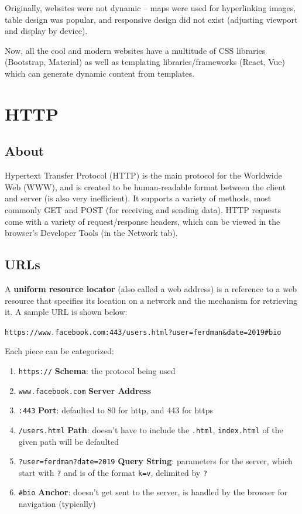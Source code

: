\documentclass{report}
\newcommand{\npar}{\par\noindent}
\newcommand{\vpar}{\vspace{1em}\npar}
\begin{document}
\par Originally, websites were not dynamic -- maps were used for hyperlinking images, table design was popular, and responsive design did not exist (adjusting viewport and display by device).

\vpar Now, all the cool and modern websites have a multitude of CSS libraries (Bootstrap, Material) as well as templating libraries/frameworks (React, Vue) which can generate dynamic content from templates.

\section{HTTP}

\subsection{About}

\par Hypertext Transfer Protocol (HTTP) is the main protocol for the Worldwide Web (WWW), and is created to be human-readable format between the client and server (is also very inefficient). It supports a variety of methods, most commonly GET and POST (for receiving and sending data). HTTP requests come with a variety of request/response headers, which can be viewed in the browser's Developer Tools (in the Network tab).

\newpage
\subsection{URLs}

\par A \textbf{uniform resource locator} (also called a web address) is a reference to a web resource that specifies its location on a network and the mechanism for retrieving it. A sample URL is shown below:

\vpar \verb|https://www.facebook.com:443/users.html?user=ferdman&date=2019#bio|
\vpar Each piece can be categorized:
\begin{enumerate}
    \item \verb|https://| \textbf{Schema}: the protocol being used
    \item \verb|www.facebook.com| \textbf{Server Address}
    \item \verb|:443| \textbf{Port}: defaulted to 80 for http, and 443 for https
    \item \verb|/users.html| \textbf{Path}: doesn't have to include the \verb|.html|, \verb|index.html| of the given path will be defaulted
    \item \verb|?user=ferdman?date=2019| \textbf{Query String}: parameters for the server, which start with \verb|?| and is of the format \verb|k=v|, delimited by \verb|?|
    \item \verb|#bio| \textbf{Anchor}: doesn't get sent to the server, is handled by the browser for navigation (typically)
\end{enumerate}
\end{document}
